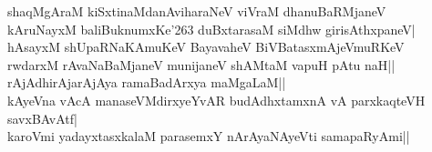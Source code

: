 \begin{shloka}
shaqMgAraM kiSxtinaMdanAviharaNeV viVraM dhanuBaRMjaneV\label{219b}\\
kAruNayxM baliBuknumxKe\char'263 duBxtarasaM siMdhw girisAthxpaneV|\\
hAsayxM shUpaRNaKAmuKeV BayavaheV BiVBatasxmAjeVmuRKeV\\
rwdarxM rAvaNaBaMjaneV munijaneV shAMtaM vapuH pAtu naH||\\
rAjAdhirAjarAjAya ramaBadArxya maMgaLaM||\\
kAyeVna vAcA manaseVMdirxyeYvAR budAdhxtamxnA vA parxkaqteVH savxBAvAtf|\label{219}\\
karoVmi yadayxtasxkalaM parasemxY nArAyaNAyeVti samapaRyAmi||
\end{shloka}
